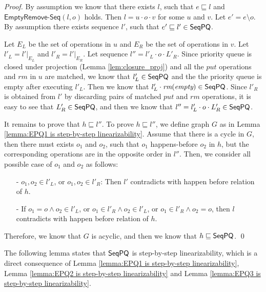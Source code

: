 \begin {proof}

By assumption we know that there exists $l$, such that $e \sqsubseteq l$ and $\mathsf{EmptyRemove\text{-}Seq}(l,o)$ holds. Then $l=u \cdot o \cdot v$ for some $u$ and $v$. Let $e' = e \setminus o$. By assumption there exists sequence $l'$, such that $e' \sqsubseteq l' \in \mathsf{SeqPQ}$.

Let $E_L$ be the set of operations in $u$ and $E_R$ be the set of operations in $v$. Let $l'_L = l' \vert_{E_L}$ and $l'_R = l' \vert_{E_R}$. Let sequence $l'' = l'_L \cdot o \cdot L'_R$. Since priority queue is closed under projection (Lemma \ref{lem:closure_proj}) and all the $\textit{put}$ operations and $\textit{rm}$ in $u$ are matched, we know that $l'_L \in \mathsf{SeqPQ}$ and the the priority queue is empty after executing $l'_L$. Then we know that $l'_L \cdot \textit{rm}(\textit{empty}) \in \mathsf{SeqPQ}$. Since $l'_R$ is obtained from $l'$ by discarding pairs of matched $\textit{put}$ and $\textit{rm}$ operations, it is easy to see that $L'_R \in \mathsf{SeqPQ}$, and then we know that $l'' = l'_L \cdot o \cdot L'_R \in \mathsf{SeqPQ}$.

It remains to prove that $h \sqsubseteq l''$. To prove $h \sqsubseteq l''$, we define graph $G$ as in Lemma \ref{lemma:EPQ1 is step-by-step linearizability}. Assume that there is a cycle in $G$, then there must exists $o_1$ and $o_2$, such that $o_1$ happens-before $o_2$ in $h$, but the corresponding operations are in the opposite order in $l''$. Then, we consider all possible case of $o_1$ and $o_2$ as follows:

\begin{itemize}
\setlength{\itemsep}{0.5pt}
\item[-] $o_1,o_2 \in l'_L$, or $o_1,o_2 \in l'_R$: Then $l'$ contradicts with happen before relation of $h$.

\item[-] If $o_1=o \wedge o_2 \in l'_L$, or $o_1 \in l'_R \wedge o_2 \in l'_L$, or $o_1 \in l'_R \wedge o_2 = o$, then $l$ contradicts with happen before relation of $h$.
\end{itemize}

Therefore, we know that $G$ is acyclic, and then we know that $h \sqsubseteq \mathsf{SeqPQ}$. \qed
\end {proof}

The following lemma states that $\mathsf{SeqPQ}$ is step-by-step linearizability, which is a direct consequence of Lemma \ref{lemma:EPQ1 is step-by-step linearizability}, Lemma \ref{lemma:EPQ2 is step-by-step linearizability} and Lemma \ref{lemma:EPQ3 is step-by-step linearizability}.


